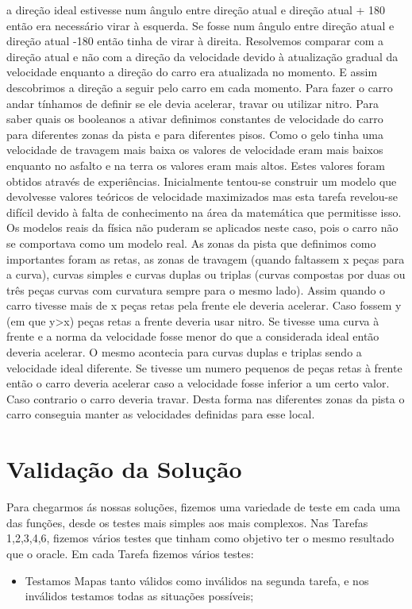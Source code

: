 \documentclass[a4paper]{report} %
\begin{document}
a direção ideal estivesse num ângulo entre direção atual e  direção atual + 180 então era necessário virar à esquerda. Se fosse num ângulo entre direção atual e direção atual -180 então tinha de virar à direita. Resolvemos comparar com a direção atual e não com a direção da velocidade devido à atualização gradual da velocidade enquanto a direção do carro era atualizada no momento. E assim descobrimos a direção a seguir pelo carro em cada momento.
  Para fazer o carro andar tínhamos de definir se ele devia acelerar, travar ou utilizar nitro. Para saber quais os booleanos a ativar definimos constantes de velocidade do carro para diferentes zonas da pista e para diferentes pisos. Como o gelo tinha uma velocidade de travagem mais baixa os valores de velocidade eram mais baixos enquanto no asfalto e na terra os valores eram mais altos. Estes valores foram obtidos através de experiências. Inicialmente tentou-se construir um modelo que devolvesse valores teóricos de velocidade maximizados mas esta tarefa revelou-se difícil devido à falta de conhecimento na área da matemática que permitisse isso. Os modelos reais da física não puderam se aplicados neste caso, pois o carro não se comportava como um modelo real. As zonas da pista que definimos como importantes foram as retas, as zonas de travagem (quando faltassem x peças para a curva), curvas simples e curvas duplas ou triplas (curvas compostas por duas ou três peças curvas com curvatura sempre para o mesmo lado). Assim quando o carro tivesse mais de x peças retas pela frente ele deveria acelerar. Caso fossem y (em que y>x) peças retas a frente deveria usar nitro. Se tivesse uma curva à frente e a norma da velocidade fosse menor do que a considerada ideal então deveria acelerar. O mesmo acontecia para curvas duplas e triplas sendo a velocidade ideal diferente. Se tivesse um numero pequenos de peças retas à frente então o carro deveria acelerar caso a velocidade fosse inferior a um certo valor. Caso contrario o carro deveria travar. Desta forma nas diferentes zonas da pista o carro conseguia manter as velocidades definidas para esse local. 
    



\chapter{Validação da Solução}

    Para chegarmos ás nossas soluções, fizemos uma variedade de teste em cada uma das funções, desde os testes mais simples aos mais complexos. Nas Tarefas 1,2,3,4,6, fizemos vários testes que tinham como objetivo ter o mesmo resultado que o oracle. 
    Em cada Tarefa fizemos vários testes:
    \begin{itemize}
          \item Testamos Mapas tanto válidos como inválidos na segunda tarefa, e nos inválidos testamos todas as situações possíveis;
    \end{itemize}
 
\end{document}
